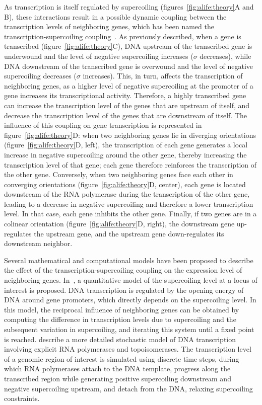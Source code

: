As transcription is itself regulated by supercoiling (figures~\ref{fig:alife:theory}A and B), these interactions result in a possible dynamic coupling between the transcription levels of neighboring genes, which has been named the transcription-supercoiling coupling~\citep{martisb.2019}.
As previously described, when a gene is transcribed (figure~\ref{fig:alife:theory}C), DNA upstream of the transcribed gene is underwound and the level of negative supercoiling increases ($\sigma$ decreases), while DNA downstream of the transcribed gene is overwound and the level of negative supercoiling decreases ($\sigma$ increases).
This, in turn, affects the transcription of neighboring genes, as a higher level of negative supercoiling at the promoter of a gene increases its transcriptional activity.
Therefore, a highly transcribed gene can increase the transcription level of the genes that are upstream of itself, and decrease the transcription level of the genes that are downstream of itself.
The influence of this coupling on gene transcription is represented in figure~\ref{fig:alife:theory}D: when two neighboring genes lie in diverging orientations (figure~\ref{fig:alife:theory}D, left), the transcription of each gene generates a local increase in negative supercoiling around the other gene, thereby increasing the transcription level of that gene; each gene therefore reinforces the transcription of the other gene.
Conversely, when two neighboring genes face each other in converging orientations (figure~\ref{fig:alife:theory}D, center), each gene is located downstream of the RNA polymerase during the transcription  of the other gene, leading to a decrease in negative supercoiling and therefore a lower transcription level. In that case, each gene inhibits the other gene.
Finally, if two genes are in a colinear orientation (figure~\ref{fig:alife:theory}D, right), the downstream gene up-regulates the upstream gene, and the upstream gene down-regulates its downstream neighbor.

Several mathematical and computational models have been proposed to describe the effect of the transcription-supercoiling coupling on the expression level of neighboring genes.
In~\cite{meyer2014}, a quantitative model of the supercoiling level at a locus of interest is proposed.
DNA transcription is regulated by the opening energy of DNA around gene promoters, which directly depends on the supercoiling level.
In this model, the reciprocal influence of neighboring genes can be obtained by computing the difference in transcription levels due to supercoiling and the subsequent variation in supercoiling, and iterating this system until a fixed point is reached.
\cite{elhoudaigui2019} describe a more detailed stochastic model of DNA transcription involving explicit RNA polymerases and topoisomerases.
The transcription level of a genomic region of interest is simulated using discrete time steps, during which RNA polymerases attach to the DNA template, progress along the transcribed region while generating positive supercoiling downstream and negative supercoiling upstream, and detach from the DNA, relaxing supercoiling constraints.

